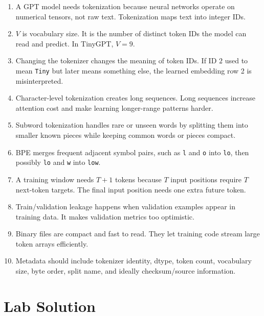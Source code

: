 \begin{enumerate}
  \item A GPT model needs tokenization because neural networks operate on numerical tensors, not raw text. Tokenization maps text into integer IDs.

  \item \(V\) is vocabulary size. It is the number of distinct token IDs the model can read and predict. In TinyGPT, \(V=9\).

  \item Changing the tokenizer changes the meaning of token IDs. If ID \(2\) used to mean \texttt{Tiny} but later means something else, the learned embedding row 2 is misinterpreted.

  \item Character-level tokenization creates long sequences. Long sequences increase attention cost and make learning longer-range patterns harder.

  \item Subword tokenization handles rare or unseen words by splitting them into smaller known pieces while keeping common words or pieces compact.

  \item BPE merges frequent adjacent symbol pairs, such as \texttt{l} and \texttt{o} into \texttt{lo}, then possibly \texttt{lo} and \texttt{w} into \texttt{low}.

  \item A training window needs \(T+1\) tokens because \(T\) input positions require \(T\) next-token targets. The final input position needs one extra future token.

  \item Train/validation leakage happens when validation examples appear in training data. It makes validation metrics too optimistic.

  \item Binary files are compact and fast to read. They let training code stream large token arrays efficiently.

  \item Metadata should include tokenizer identity, dtype, token count, vocabulary size, byte order, split name, and ideally checksum/source information.
\end{enumerate}

\section{Lab Solution}

